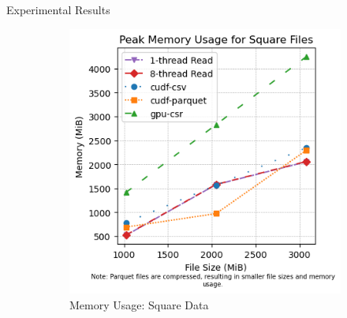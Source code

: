 \documentclass{beamer}
\begin{document}
\begin{frame}{Experimental Results}
  \begin{figure}[h!]
   \centering
   
   \begin{subfigure}[b]{0.45\linewidth}
     \centering
     \includegraphics[width=\linewidth]{memory_square.png}
     \caption{Memory Usage: Square Data}
     \label{fig:memory_square}
   \end{subfigure}
   \hfill
   \begin{subfigure}[b]{0.45\linewidth}
     \centering

\end{subfigure}
\end{figure}
\end{frame}
\end{document}
